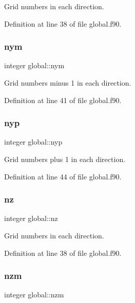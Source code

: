 Grid numbers in each direction. 



Definition at line 38 of file global.\+f90.

\mbox{\label{namespaceglobal_a9852876e90514ccc182c0ed0b27cdaad}} 
\subsubsection{\texorpdfstring{nym}{nym}}
{\footnotesize\ttfamily integer global\+::nym}



Grid numbers minus 1 in each direction. 



Definition at line 41 of file global.\+f90.

\mbox{\label{namespaceglobal_a868bbe46b97daa7ff6c962fff16bbf2f}} 
\subsubsection{\texorpdfstring{nyp}{nyp}}
{\footnotesize\ttfamily integer global\+::nyp}



Grid numbers plus 1 in each direction. 



Definition at line 44 of file global.\+f90.

\mbox{\label{namespaceglobal_ab8d7436a6037d4c1b7248107a2f07d76}} 
\subsubsection{\texorpdfstring{nz}{nz}}
{\footnotesize\ttfamily integer global\+::nz}



Grid numbers in each direction. 



Definition at line 38 of file global.\+f90.

\mbox{\label{namespaceglobal_a76e27e2001870f6606e51d33a2c70f60}} 
\subsubsection{\texorpdfstring{nzm}{nzm}}
{\footnotesize\ttfamily integer global\+::nzm}



